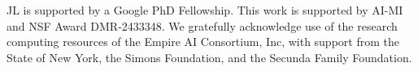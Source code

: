 JL is supported by a Google PhD Fellowship.
This work is supported by AI-MI and NSF Award DMR-2433348. We gratefully acknowledge use of the research computing resources of the Empire AI Consortium, Inc, with support from the State of New York, the Simons Foundation, and the Secunda Family Foundation.